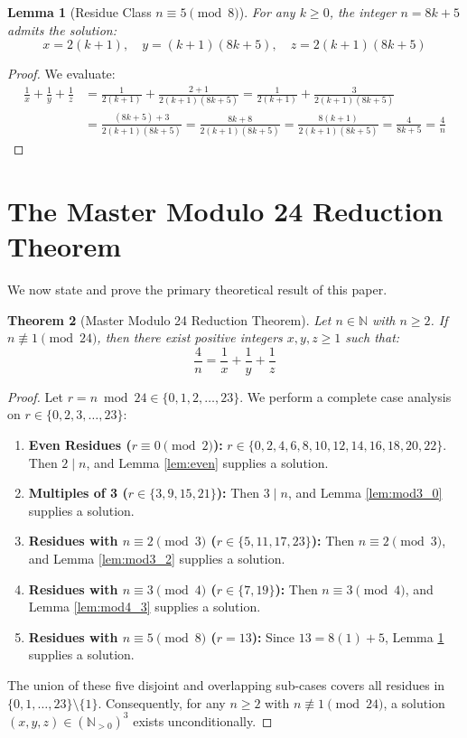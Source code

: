 \documentclass[11pt,a4paper]{article}
\newtheorem{theorem}{Theorem}[section]
\newtheorem{lemma}[theorem]{Lemma}
\theoremstyle{definition}
\begin{document}
\begin{lemma}[Residue Class $n \equiv 5 \pmod 8$]\label{lem:mod8_5}
For any $k \ge 0$, the integer $n = 8k+5$ admits the solution:
\[ x = 2(k+1), \quad y = (k+1)(8k+5), \quad z = 2(k+1)(8k+5) \]
\end{lemma}
\begin{proof}
We evaluate:
\begin{align*}
\frac{1}{x} + \frac{1}{y} + \frac{1}{z} &= \frac{1}{2(k+1)} + \frac{2 + 1}{2(k+1)(8k+5)} = \frac{1}{2(k+1)} + \frac{3}{2(k+1)(8k+5)} \\
&= \frac{(8k+5) + 3}{2(k+1)(8k+5)} = \frac{8k+8}{2(k+1)(8k+5)} = \frac{8(k+1)}{2(k+1)(8k+5)} = \frac{4}{8k+5} = \frac{4}{n}
\end{align*}
\end{proof}

\section{The Master Modulo 24 Reduction Theorem}

We now state and prove the primary theoretical result of this paper.

\begin{theorem}[Master Modulo 24 Reduction Theorem]\label{thm:master24}
Let $n \in \mathbb{N}$ with $n \ge 2$. If $n \not\equiv 1 \pmod{24}$, then there exist positive integers $x, y, z \ge 1$ such that:
\[ \frac{4}{n} = \frac{1}{x} + \frac{1}{y} + \frac{1}{z} \]
\end{theorem}

\begin{proof}
Let $r = n \bmod 24 \in \{0, 1, 2, \dots, 23\}$. We perform a complete case analysis on $r \in \{0, 2, 3, \dots, 23\}$:
\begin{enumerate}
    \item \textbf{Even Residues ($r \equiv 0 \pmod 2$):}
    $r \in \{0, 2, 4, 6, 8, 10, 12, 14, 16, 18, 20, 22\}$. Then $2 \mid n$, and Lemma \ref{lem:even} supplies a solution.
    \item \textbf{Multiples of 3 ($r \in \{3, 9, 15, 21\}$):}
    Then $3 \mid n$, and Lemma \ref{lem:mod3_0} supplies a solution.
    \item \textbf{Residues with $n \equiv 2 \pmod 3$ ($r \in \{5, 11, 17, 23\}$):}
    Then $n \equiv 2 \pmod 3$, and Lemma \ref{lem:mod3_2} supplies a solution.
    \item \textbf{Residues with $n \equiv 3 \pmod 4$ ($r \in \{7, 19\}$):}
    Then $n \equiv 3 \pmod 4$, and Lemma \ref{lem:mod4_3} supplies a solution.
    \item \textbf{Residues with $n \equiv 5 \pmod 8$ ($r = 13$):}
    Since $13 = 8(1) + 5$, Lemma \ref{lem:mod8_5} supplies a solution.
\end{enumerate}
The union of these five disjoint and overlapping sub-cases covers all residues in $\{0, 1, \dots, 23\} \setminus \{1\}$.
Consequently, for any $n \ge 2$ with $n \not\equiv 1 \pmod{24}$, a solution $(x,y,z) \in (\mathbb{N}_{>0})^3$ exists unconditionally.
\end{proof}
\end{document}
